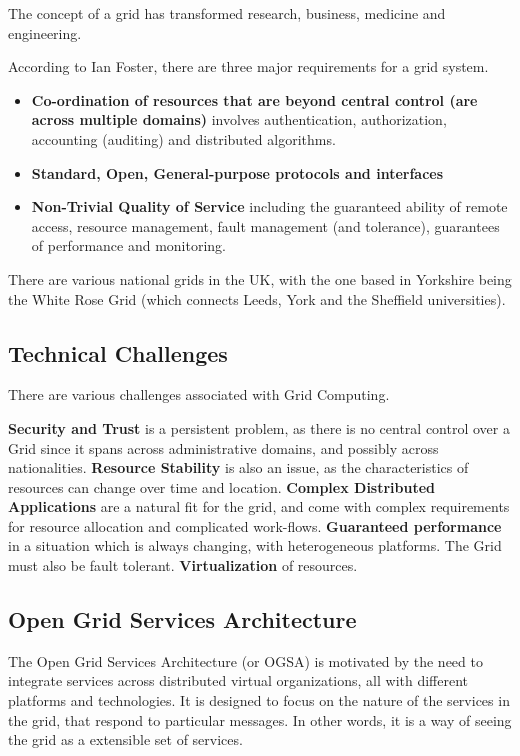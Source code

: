 \documentclass{article}
\begin{document}
The concept of a grid has transformed research, business, medicine and engineering.

According to Ian Foster, there are three major requirements for a grid system.

\begin{itemize}
    \item \textbf{Co-ordination of resources that are beyond central control (are across multiple domains)} involves authentication, authorization, accounting (auditing) and distributed algorithms.
    \item \textbf{Standard, Open, General-purpose protocols and interfaces}
    \item \textbf{Non-Trivial Quality of Service} including the guaranteed ability of remote access, resource management, fault management (and tolerance), guarantees of performance and monitoring.
\end{itemize}

There are various national grids in the UK, with the one based in Yorkshire being the White Rose Grid (which connects Leeds, York and the Sheffield universities).

\subsection{Technical Challenges}
There are various challenges associated with Grid Computing.

\textbf{Security and Trust} is a persistent problem, as there is no central control over a Grid since it spans across administrative domains, and possibly across nationalities.
\textbf{Resource Stability} is also an issue, as the characteristics of resources can change over time and location.
\textbf{Complex Distributed Applications} are a natural fit for the grid, and come with complex requirements for resource allocation and complicated work-flows.
\textbf{Guaranteed performance} in a situation which is always changing, with heterogeneous platforms. The Grid must also be fault tolerant.
\textbf{Virtualization} of resources.

\subsection{Open Grid Services Architecture}
The Open Grid Services Architecture (or OGSA) is motivated by the need to integrate services across distributed virtual organizations, all with different platforms and technologies. It is designed to focus on the nature of the services in the grid, that respond to particular messages. In other words, it is a way of seeing the grid as a extensible set of services.
\end{document}
